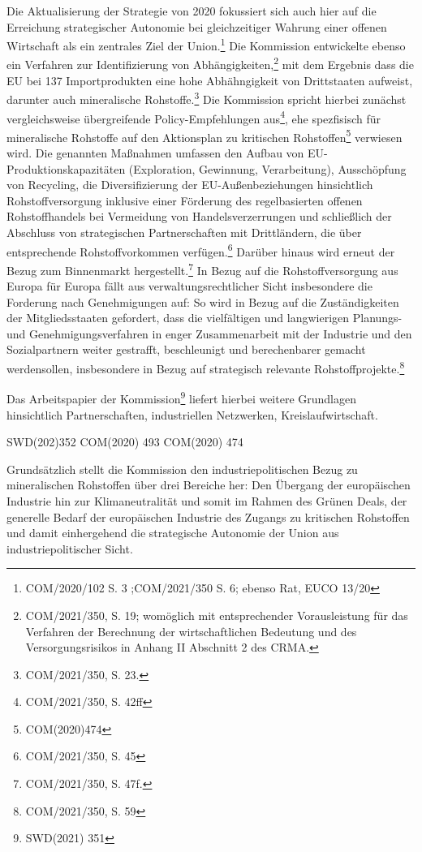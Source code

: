 \documentclass[12pt,a4paper,oneside]{book} %
\begin{document}
Die Aktualisierung der Strategie von 2020 fokussiert sich auch hier auf die Erreichung strategischer Autonomie bei gleichzeitiger Wahrung einer offenen Wirtschaft als ein zentrales Ziel der Union.\footnote{COM/2020/102 S. 3  ;COM/2021/350 S. 6; ebenso Rat, EUCO 13/20} Die Kommission entwickelte ebenso ein Verfahren zur Identifizierung von Abhängigkeiten,\footnote{COM/2021/350, S. 19; womöglich mit entsprechender Vorausleistung für das Verfahren der Berechnung der wirtschaftlichen Bedeutung und des Versorgungsrisikos in Anhang II Abschnitt 2 des CRMA.} mit dem Ergebnis dass die EU bei 137 Importprodukten eine hohe Abhähngigkeit von Drittstaaten aufweist, darunter auch mineralische Rohstoffe.\footnote{COM/2021/350, S. 23.} Die Kommission spricht hierbei zunächst vergleichsweise übergreifende Policy-Empfehlungen aus\footnote{COM/2021/350, S. 42ff}, ehe spezfisisch für mineralische Rohstoffe auf den Aktionsplan zu kritischen Rohstoffen\footnote{ COM(2020)474} verwiesen wird. Die genannten Maßnahmen umfassen den Aufbau von EU-Produktionskapazitäten (Exploration, Gewinnung, Verarbeitung), Ausschöpfung von Recycling, die Diversifizierung der EU-Außenbeziehungen hinsichtlich Rohstoffversorgung inklusive einer Förderung des regelbasierten offenen Rohstoffhandels bei Vermeidung von Handelsverzerrungen und schließlich der Abschluss von strategischen Partnerschaften mit Drittländern, die über entsprechende Rohstoffvorkommen verfügen.\footnote{COM/2021/350, S. 45} Darüber hinaus wird erneut der Bezug zum Binnenmarkt hergestellt.\footnote{COM/2021/350, S. 47f.} In Bezug auf die Rohstoffversorgung aus Europa für Europa fällt aus verwaltungsrechtlicher Sicht insbesondere die Forderung nach Genehmigungen auf: So wird in Bezug auf die Zuständigkeiten der Mitgliedsstaaten gefordert, dass die \glqq vielfältigen und langwierigen Planungs- und Genehmigungsverfahren in enger Zusammenarbeit mit der Industrie und den Sozialpartnern weiter gestrafft, beschleunigt und berechenbarer gemacht werden\glqq sollen, insbesondere in Bezug auf strategisch relevante Rohstoffprojekte.\footnote[Übersetzung aus dem Englischen]{COM/2021/350, S. 59}

Das Arbeitspapier der Kommission\footnote{SWD(2021) 351} liefert hierbei weitere Grundlagen hinsichtlich Partnerschaften, industriellen Netzwerken, Kreislaufwirtschaft.

SWD(202)352
COM(2020) 493
COM(2020) 474

Grundsätzlich stellt die Kommission den industriepolitischen Bezug zu mineralischen Rohstoffen über drei Bereiche her: Den Übergang der europäischen Industrie hin zur Klimaneutralität und somit im Rahmen des Grünen Deals, der generelle Bedarf der europäischen Industrie des Zugangs zu kritischen Rohstoffen und damit einhergehend die strategische Autonomie der Union aus industriepolitischer Sicht.
\end{document}
